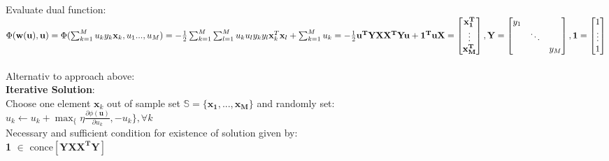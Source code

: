 \begin{sectionbox}
Evaluate dual function: \\
$\Phi(\mathbf{w(\mathbf{u})}, \mathbf{u}) = \Phi(\sum_{k=1}^{M}u_ky_k\mathbf{x}_k, u_1...,u_M) \\
= -\frac{1}{2}\sum_{k=1}^{M}\sum_{l=1}^{M}u_ku_ly_ky_l\mathbf{x}_k^T\mathbf{x}_l + \sum_{k=1}^{M}u_k \\
= -\frac{1}{2}\mathbf{u^T}\mathbf{YXX^TYu}+\mathbf{1^Tu} \\
\mathbf{X}= \begin{bmatrix}
\mathbf{x_1^T} \\
\vdots \\
\mathbf{x_M^T}
\end{bmatrix}, \mathbf{Y} =\begin{bmatrix}
y_1 & & \\
&\ddots &\\
& & y_M
\end{bmatrix}, \mathbf{1} = \begin{bmatrix}
 1\\
 \vdots\\
 1
\end{bmatrix} $ \\
\\ Alternativ to approach above: \\
\textbf{Iterative Solution}:\\
Choose one element $\mathbf{x}_k$ out of sample set $\mathbb{S}=\{\mathbf{x_1,...,x_M}\}$ and randomly set: \\
$ u_k\leftarrow u_k+\max_\{\eta\frac{\partial\phi(\mathbf{u})}{\partial u_k},-u_k\}, \forall k$ \\
Necessary and sufficient condition for existence of solution given by:\\ \textbf{1} $\in$ conce$[\mathbf{YXX^TY}]$
	


\end{sectionbox}
